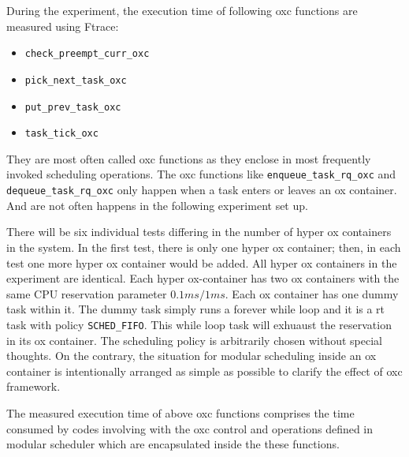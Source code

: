 During the experiment, the execution time of following oxc functions are 
measured using Ftrace:
\begin{itemize} 
\item \texttt{check\_preempt\_curr\_oxc}
\item \texttt{pick\_next\_task\_oxc}
\item \texttt{put\_prev\_task\_oxc}
\item \texttt{task\_tick\_oxc}
\end{itemize} 
They are most often called oxc functions as they enclose in most frequently
invoked scheduling operations. 
The oxc functions like 
\texttt{enqueue\_task\_rq\_oxc} and \texttt{dequeue\_task\_rq\_oxc} only 
happen when a task enters or leaves an ox container. And are not often
happens in the following experiment set up.

There will be six individual tests differing in the number of hyper ox 
containers in the system. In the first test, there is only one hyper 
ox container; then, in each test one more hyper ox container would be 
added. All hyper ox containers in the experiment are identical.
Each hyper ox-container has two ox containers with the same CPU 
reservation parameter $0.1ms/1ms$. Each ox container has one dummy task 
within it. The dummy task simply runs a forever while loop and it is a 
rt task with policy \texttt{SCHED\_FIFO}. This while loop task will 
exhuaust the reservation in its ox container. The scheduling policy is 
arbitrarily chosen without special thoughts. On the contrary, the 
situation for modular scheduling inside an ox container is intentionally
arranged as simple as possible to clarify the effect of oxc framework.

The measured execution time of above oxc functions comprises the time 
consumed by codes involving with the oxc control and operations defined 
in modular scheduler which are encapsulated inside the these functions.

